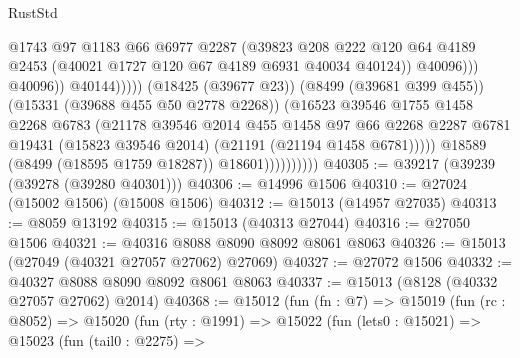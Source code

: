 \begin{lexlean}{RustStd}
\begin{coremodule}
                                              @1743
                                              @97
                                              @1183
                                              @66
                                              @6977
                                              @2287
                                              (@39823
                                                @208
                                                @222
                                                @120
                                                @64
                                                @4189
                                                @2453
                                                (@40021 @1727 @120 @67 @4189 @6931 @40034 @40124))
                                              @40096)))
                                        @40096))
                                    @40144)))))
                          (@18425 (@39677 @23))
                          (@8499 (@39681 @399 @455))
                          (@15331 (@39688 @455 @50 @2778 @2268))
                          (@16523
                            @39546
                            @1755
                            @1458
                            @2268
                            @6783
                            (@21178
                              @39546
                              @2014
                              @455
                              @1458
                              @97
                              @66
                              @2268
                              @2287
                              @6781
                              @19431
                              (@15823 @39546 @2014)
                              (@21191 (@21194 @1458 @6781)))))
                        @18589
                        (@8499 (@18595 @1759 @18287))
                        @18601))))))))))
@40305 := @39217 (@39239 (@39278 (@39280 @40301)))
@40306 := @14996 @1506
@40310 := @27024 (@15002 @1506) (@15008 @1506)
@40312 := @15013 (@14957 @27035)
@40313 := @8059 @13192
@40315 := @15013 (@40313 @27044)
@40316 := @27050 @1506
@40321 := @40316 @8088 @8090 @8092 @8061 @8063
@40326 := @15013 (@27049 (@40321 @27057 @27062) @27069)
@40327 := @27072 @1506
@40332 := @40327 @8088 @8090 @8092 @8061 @8063
@40337 := @15013 (@8128 (@40332 @27057 @27062) @2014)
@40368 := @15012
    (fun (fn : @7) =>
    @15019
      (fun (rc : @8052) =>
      @15020
        (fun (rty : @1991) =>
        @15022
          (fun (lets0 : @15021) =>
          @15023
            (fun (tail0 : @2275) =>

\end{coremodule}
\end{lexlean}
